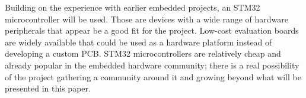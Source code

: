 Building on the experience with earlier embedded projects, an STM32 microcontroller will be used. Those are \armcm devices with a wide range of hardware peripherals that appear be a good fit for the project. Low-cost evaluation boards are widely available that could be used as a hardware platform instead of developing a custom \gls{PCB}. STM32 microcontrollers are relatively cheap and already popular in the embedded hardware community; there is a real possibility of the project gathering a community around it and growing beyond what will be presented in this paper.

